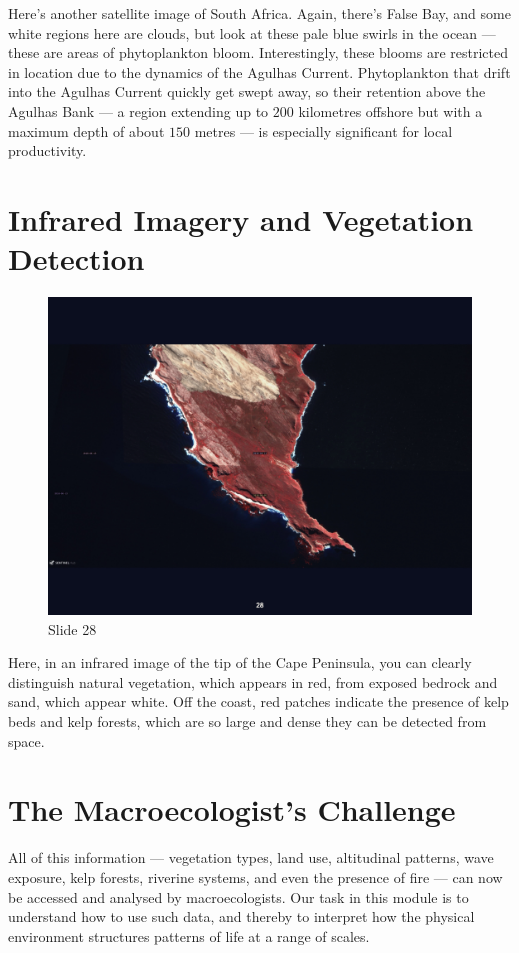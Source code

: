 \documentclass[
  12pt,
]{book}
\begin{document}
Here's another satellite image of South Africa. Again, there's False
Bay, and some white regions here are clouds, but look at these pale blue
swirls in the ocean --- these are areas of phytoplankton bloom.
Interestingly, these blooms are restricted in location due to the
dynamics of the Agulhas Current. Phytoplankton that drift into the
Agulhas Current quickly get swept away, so their retention above the
Agulhas Bank --- a region extending up to \(200\) kilometres offshore
but with a maximum depth of about \(150\) metres --- is especially
significant for local productivity.

\section{Infrared Imagery and Vegetation
Detection}\label{infrared-imagery-and-vegetation-detection}

\begin{figure}[ht]
\centering
\includegraphics[width=0.8\linewidth]{../images/BDC334/BDC334-028.jpeg}
\caption*{Slide 28}
\end{figure}

Here, in an infrared image of the tip of the Cape Peninsula, you can
clearly distinguish natural vegetation, which appears in red, from
exposed bedrock and sand, which appear white. Off the coast, red patches
indicate the presence of kelp beds and kelp forests, which are so large
and dense they can be detected from space.

\section{The Macroecologist's
Challenge}\label{the-macroecologists-challenge}

All of this information --- vegetation types, land use, altitudinal
patterns, wave exposure, kelp forests, riverine systems, and even the
presence of fire --- can now be accessed and analysed by
macroecologists. Our task in this module is to understand how to use
such data, and thereby to interpret how the physical environment
structures patterns of life at a range of scales.
\end{document}
